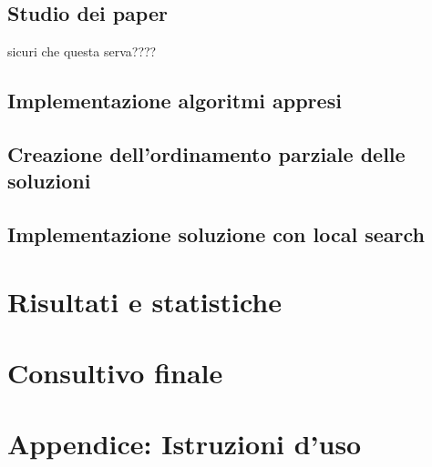 \documentclass[a4paper,titlepage]{article}
\begin{document}
\subsection{Studio dei paper} 

sicuri che questa serva????
\subsection{Implementazione algoritmi appresi}
\subsection{Creazione dell'ordinamento parziale delle soluzioni}
\subsection{Implementazione soluzione con local search}

\section{Risultati e statistiche}

\section{Consultivo finale}

\section{Appendice: Istruzioni d'uso}
\end{document}
